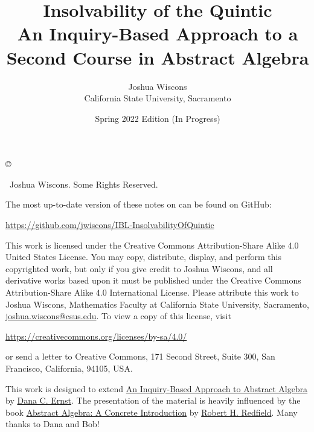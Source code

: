 \documentclass[12pt,oneside]{book}
\theoremstyle{definition}
\begin{document}
\title{Insolvability of the Quintic\\ {\normalsize \normalfont  An Inquiry-Based Approach to a Second Course in Abstract Algebra}}
\author{Joshua Wiscons\\
California State University, Sacramento}
\date{Spring 2022 Edition (In Progress)}

\maketitle

\noindent\copyright{ \the\year\ Joshua Wiscons.  Some Rights Reserved.\\

\bigskip

\noindent The most up-to-date version of these notes on can be found on GitHub:
\begin{center}
\url{https://github.com/jwiscons/IBL-InsolvabilityOfQuintic}
\end{center}

\bigskip

\noindent This work is licensed under the Creative Commons Attribution-Share Alike 4.0 United States License.  You may copy, distribute, display, and perform this copyrighted work, but only if you give credit to Joshua Wiscons, and all derivative works based upon it must be published under the Creative Commons Attribution-Share Alike 4.0 International License. Please attribute this work to Joshua Wiscons, Mathematics Faculty at California State University, Sacramento, \url{joshua.wiscons@csus.edu}. To view a copy of this license, visit
\begin{center}
\url{https://creativecommons.org/licenses/by-sa/4.0/}
\end{center}
or send a letter to Creative Commons, 171 Second Street, Suite 300, San Francisco, California, 94105, USA.}

\medskip

\begin{center}
\ccbysa
\end{center}

\bigskip

\noindent This work is designed to extend \href{https://github.com/dcernst/IBL-AbstractAlgebra}{An Inquiry-Based Approach to Abstract Algebra} by \href{http://danaernst.com}{Dana C. Ernst}. The presentation of the material is heavily influenced by the book \href{https://www.amazon.com/Abstract-Algebra-Introduction-Robert-Redfield/dp/020143721X}{Abstract Algebra: A Concrete Introduction} by \href{https://www.hamilton.edu/academics/our-faculty/directory/faculty-detail/robert-redfield}{Robert H. Redfield}. Many thanks to  Dana and Bob! 
\end{document}
